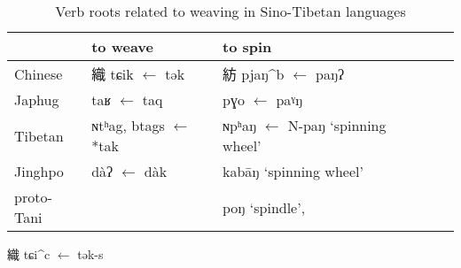 \documentclass[oldfontcommands,oneside,a4paper,11pt]{article}
\newcommand{\ipa}[1]{{\phon #1}} %
\newcommand{\pform}[2]{\ipa{#1} $\leftarrow$ \ipa{*#2}}
\newcommand{\zhc}[3]{{\cn #1} \pform{#2}{#3}}
\begin{document}
\begin{table}[H]
\caption{Verb roots related to weaving in Sino-Tibetan languages}
\begin{tabular}{llllll}
\toprule
&to weave &  to spin  \\
\midrule
Chinese & \zhc{織}{tɕik}{tək}&  \zhc{紡}{pjaŋ^b}{paŋʔ} & \\
Japhug& \pform{taʁ}{taq} & \pform{pɣo}{paˠŋ} & \\
Tibetan& \pform{ɴtʰag, btags}{*tak} & \pform{ɴpʰaŋ}{N-paŋ} `spinning wheel'& \\
Jinghpo & \pform{dàʔ}{dàk}&\ipa{kabāŋ} `spinning wheel' \\
proto-Tani & &\ipa{*poŋ} `spindle', \citet[227]{jackson93}\\
\bottomrule
\end{tabular}
\end{table}

\zhc{織}{tɕi^c}{tək-s} 


\end{document}
